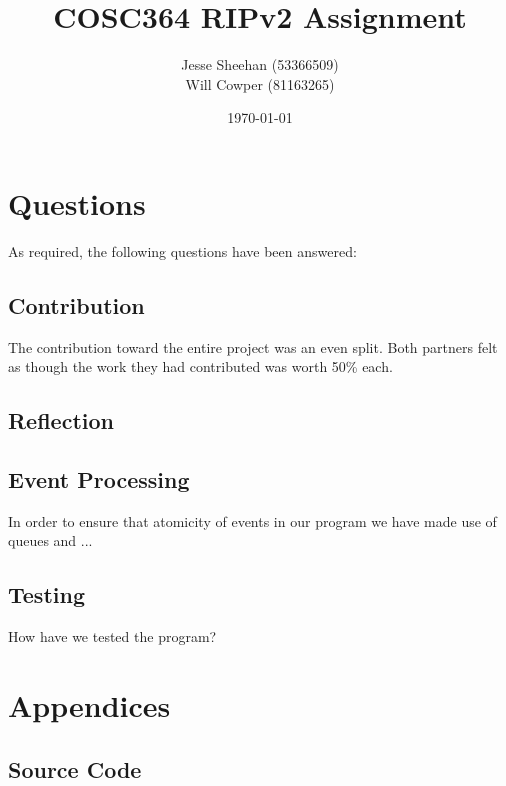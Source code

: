 \documentclass[11pt]{article} %
\title{COSC364 RIPv2 Assignment}
\date{\today}
\author{Jesse Sheehan (53366509)\\ Will Cowper (81163265)}
\begin{document}
\maketitle

\tableofcontents

\newpage



\section{Questions}

As required, the following questions have been answered:

\subsection{Contribution}
The contribution toward the entire project was an even split. Both partners felt as though the work they had contributed was worth 50\% each.

\subsection{Reflection}



\subsection{Event Processing}
In order to ensure that atomicity of events in our program we have made use of queues and ...


\subsection{Testing}
How have we tested the program?

\newpage
\section{Appendices}

\subsection{Source Code}
\end{document}
